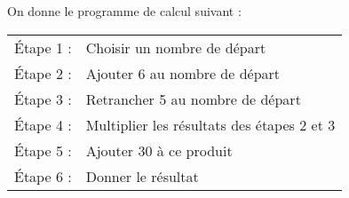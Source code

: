 
\medskip

On donne le programme de calcul suivant :

\begin{center}
\begin{tabularx}{0.6\linewidth}{|l|X|}\hline
Étape 1 :& Choisir un nombre de départ\\
Étape 2 :& Ajouter 6 au nombre de départ\\
Étape 3 :& Retrancher 5 au nombre de départ\\
Étape 4 :& Multiplier les résultats des étapes 2 et 3\\
Étape 5 :& Ajouter 30 à ce produit\\
Étape 6 :& Donner le résultat\\ \hline
\end{tabularx}
\end{center}

